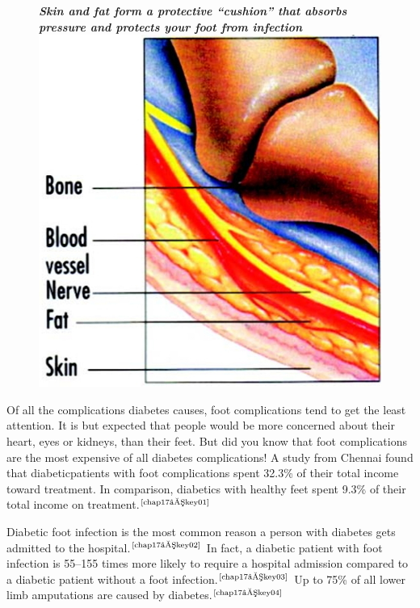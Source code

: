 \begin{figure}
\centering
{\small\textbf{\textit{Skin and fat form a protective “cushion” that absorbs pressure and protects your foot from infection}}}\\
\includegraphics[scale=.8]{images/056.jpg}
\end{figure}

Of all the complications diabetes causes, foot complications tend to get the least attention. It is but expected that people would be more concerned about their heart, eyes or kidneys, than their feet. But did you know that foot complications are the most expensive of all diabetes complications! A study from Chennai found that diabetic\break patients with foot complications spent 32.3\% of their total income toward treatment. In comparison, diabetics with healthy feet spent 9.3\% of their total income on treatment.$^{\text{\cite{chap17–key01}}}$

Diabetic foot infection is the most common reason a person with diabetes gets admitted to the hospital.$^{\text{\cite{chap17–key02}}}$ In fact, a diabetic patient with foot infection is 55–155 times more likely to require a hospital admi\-ssion compared to a diabetic patient without a foot infection.$^{\text{\cite{chap17–key03}}}$ Up to 75\% of all lower limb amputations are caused by diabetes.$^{\text{\cite{chap17–key04}}}$

